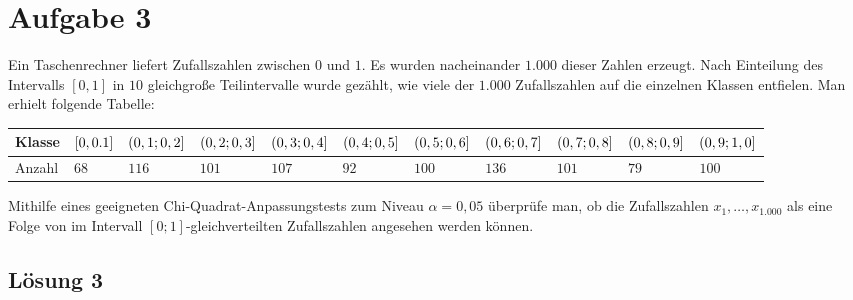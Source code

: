 \documentclass[main.tex]{subfiles}
\begin{document}
\section{Aufgabe 3}
Ein Taschenrechner liefert Zufallszahlen zwischen $0$ und $1$. Es wurden nacheinander $1.000$ dieser Zahlen erzeugt. Nach Einteilung des Intervalls $[0,1]$ in $10$ gleichgroße Teilintervalle wurde gezählt, wie viele der $1.000$ Zufallszahlen auf die einzelnen Klassen entfielen. Man erhielt folgende Tabelle:
\begin{center}
\begin{tabular}{|l|p{0.75cm}|p{0.75cm}|p{0.75cm}|p{0.75cm}|p{0.75cm}|p{0.75cm}|p{0.75cm}|p{0.75cm}|p{0.75cm}|p{0.75cm}|} \hline
Klasse & $[0,\newline0.1]$ & $(0,1; \newline 0,2]$ & $(0,2; \newline 0,3]$ 
	& $(0,3; \newline 0,4]$ & $(0,4; \newline 0,5]$ & $(0,5; \newline 0,6]$ 
	& $(0,6; \newline 0,7]$ & $(0,7; \newline 0,8]$ & $(0,8; \newline 0,9]$ 
	& $(0,9; \newline 1,0]$ \\ \hline
Anzahl & $68$ & $116$ & $101$ & $107$ & $92$ & $100$ & $136$ & $101$ & $79$ & $100$ \\ \hline
\end{tabular}
\end{center}
Mithilfe eines geeigneten Chi-Quadrat-Anpassungstests zum Niveau $\alpha=0,05$ überprüfe man, ob die Zufallszahlen $x_1,\dots,x_{1.000}$ als eine Folge von im Intervall $[0;1]$-gleichverteilten Zufallszahlen angesehen werden können.

\subsection{Lösung 3}
\end{document}
